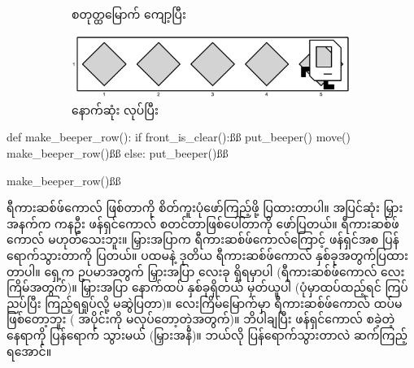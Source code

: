 \begin{figure}[thb!]
\begin{subfigure}[t]{{\figpctw}\textwidth}
        \caption{စတုတ္ထမြောက် ကျော့ပြီး}  
        \label{fig:mrofb_recur5}  
    \end{subfigure}
    \begin{subfigure}[t]{{\figpctw}\textwidth}
        \includegraphics[scale=0.15]{images/ch04/mrofb/after.jpg}
        \caption{နောက်ဆုံး  လုပ်ပြီး}    
        \label{fig:mrofb_recur6}
    \end{subfigure}
    \caption{}
    \label{fig:mrofb_recur}
\end{figure}


%
\begin{py}
def make_beeper_row():
    if front_is_clear():ßß
        put_beeper()
        move()
        make_beeper_row()ßß
    else:
        put_beeper()ßß

make_beeper_row()ßß
\end{py}
%
%
\btwntikzannoandpar

ရီကားဆစ်ဖ်ကောလ် ဖြစ်တာကို စိတ်ကူးပုံဖော်ကြည့်ဖို့ ပြထားတာပါ။ အပြင်ဆုံး မြှားအနက်က ကန\allowbreak ဦး ဖန်ရှင်ကောလ် စတင်တာဖြစ်ပေါ်တာကို ဖော်ပြတယ်။ ရီကားဆစ်ဖ်ကောလ် မဟုတ်သေးဘူး။ မြှားအပြာက ရီကားဆစ်ဖ်ကောလ်ကြောင့် ဖန်ရှင်အစ ပြန်ရောက်သွားတာကို ပြတယ်။ ပထမနဲ့ ဒုတိယ ရီကားဆစ်ဖ်ကောလ် နှစ်ခုအတွက်ပြထားတာပါ။ ရှေ့က ဥပမာအတွက် မြှားအပြာ လေးခု ရှိရမှာပါ (ရီကားဆစ်ဖ်ကောလ် လေးကြိမ်အတွက်)။  မြှားအပြာ နောက်ထပ် နှစ်ခုရှိတယ် မှတ်ယူပါ (ပုံမှာထပ်ထည့်ရင် ကြပ်ညပ်ပြီး ကြည့်ရရှုပ်လို့ မဆွဲပြတာ)။ လေးကြိမ်မြောက်မှာ ရီကားဆစ်ဖ်ကောလ် ထပ်မဖြစ်တော့ဘူး ( အပိုင်းကို မလုပ်တော့တဲ့အတွက်)။ ဘိပါချပြီး ဖန်ရှင်ကောလ် စခဲ့တဲ့နေရာကို ပြန်ရောက် သွားမယ် (မြှားအနီ)။ ဘယ်လို ပြန်ရောက်သွားတာလဲ ဆက်ကြည့်ရအောင်။


